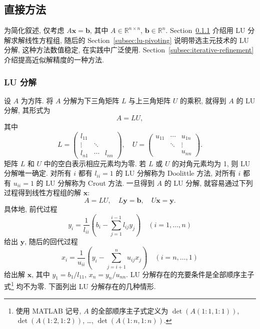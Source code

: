 \subsection{{直接方法}}\label{sec:direct-methods}
{为简化叙述, 仅考虑 $A\bm x=\bm b$, 其中 $A\in\mathbb R^{n\times n}$, $\bm b\in\mathbb R^n$. Section~\ref{subsec:lu-decomposition} 介绍用 LU 分解求解线性方程组, 随后的 Section~\ref{subsec:lu-pivoting} 说明带选主元技术的 LU 分解, 这种方法数值稳定, 在实践中广泛使用. Section~\ref{subsec:iterative-refinement} 介绍提高近似解精度的一种方法.}
\subsubsection{{LU 分解}}\label{subsec:lu-decomposition}
{设 $A$ 为方阵. 将 $A$ 分解为下三角矩阵 $L$ 与上三角矩阵 $U$ 的乘积, 就得到 $A$ 的 LU 分解, 其形式为}
\begin{equation}\label{eq:lu-factorization}A=LU,\end{equation}
{其中}
\[
L=\begin{pmatrix}l_{11}&&\\\vdots&\ddots&\\l_{n1}&\cdots&l_{nn}\end{pmatrix},\quad
U=\begin{pmatrix}u_{11}&\cdots&u_{1n}\\&\ddots&\vdots\\&&u_{nn}\end{pmatrix}.
\]
{矩阵 $L$ 和 $U$ 中的空白表示相应元素均为零.}
{若 $L$ 或 $U$ 的对角元素均为 1, 则 LU 分解唯一确定. 对所有 $i$ 都有 $l_{ii}=1$ 的 LU 分解称为 Doolittle 方法, 对所有 $i$ 都有 $u_{ii}=1$ 的 LU 分解称为 Crout 方法. 一旦得到 $A$ 的 LU 分解, 就容易通过下列过程得到线性方程组的解 $\bm x$:}
\begin{equation}\label{eq:lu-triangular-solves}A=LU,\quad L\bm y=\bm b,\quad U\bm x=\bm y.\end{equation}
{具体地, 前代过程}
\[
y_i=\frac1{l_{ii}}\left(b_i-\sum_{j=1}^{i-1}l_{ij}y_j\right)\quad(i=1,\ldots,n)
\]
{给出 $\bm y$, 随后的回代过程}
\[
x_i=\frac1{u_{ii}}\left(y_i-\sum_{j=i+1}^n u_{ij}x_j\right)\quad(i=n,\ldots,1)
\]
{给出解 $\bm x$, 其中 $y_1=b_1/l_{11}$, $x_n=y_n/u_{nn}$.}
{\leavevmode{}\label{idx:chapter-01-section-03:lu-existence}LU 分解存在的充要条件是全部顺序主子式\footnote{使用 MATLAB 记号, $A$ 的全部顺序主子式定义为 $\det(A(1:1,1:1))$, $\det(A(1:2,1:2))$, \ldots, $\det(A(1:n,1:n))$.} 均不为零. 下面列出 LU 分解存在的几种情形.}
